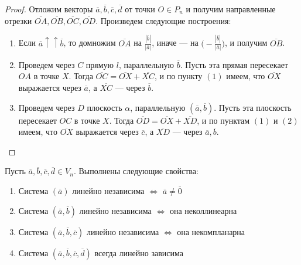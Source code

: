 \begin{proof}
	Отложим векторы $\overline{a}, \overline{b}, \overline{c}, \overline{d}$ от точки $O \in P_n$ и получим направленные отрезки $\overline{OA}, \overline{OB}, \overline{OC}, \overline{OD}$. Произведем следующие построения:
	\begin{enumerate}
		\item Если $\overline{a} \uparrow\uparrow \overline{b}$, то домножим $\overline{OA}$ на $\frac{|\overline{b}|}{|\overline{a}|}$, иначе --- на $\big(\!-\!\frac{|\overline{b}|}{|\overline{a}|}\big)$, и получим $\overline{OB}$.
		\item Проведем через $C$ прямую $l$, параллельную $\overline{b}$. Пусть эта прямая пересекает $OA$ в точке $X$. Тогда $\overline{OC} = \overline{OX} + \overline{XC}$, и по пункту $(1)$ имеем, что $\overline{OX}$ выражается через $\overline{a}$, а $\overline{XC}$ --- через $\overline{b}$.
		\item Проведем через $D$ плоскость $\alpha$, параллельную $(\overline{a}, \overline{b})$. Пусть эта плоскость пересекает $OC$ в точке $X$. Тогда $\overline{OD} = \overline{OX} + \overline{XD}$, и по пунктам $(1)$ и $(2)$ имеем, что $\overline{OX}$ выражается через $\overline{c}$, а $\overline{XD}$ --- через $\overline{a}, \overline{b}$.\qedhere
	\end{enumerate}
\end{proof}

\begin{theorem}
	Пусть $\overline{a}, \overline{b}, \overline{c}, \overline{d} \in V_n$. Выполнены следующие свойства:
	\begin{enumerate}
		\item Система $(\overline{a})$ линейно независима $\Leftrightarrow$ $\overline{a} \ne \overline{0}$
		\item Система $(\overline{a}, \overline{b})$ линейно независима $\Leftrightarrow$ она неколлинеарна
		\item Система $(\overline{a}, \overline{b}, \overline{c})$ линейно независима $\Leftrightarrow$ она некомпланарна
		\item Система $(\overline{a}, \overline{b}, \overline{c}, \overline{d})$ всегда линейно зависима
	\end{enumerate}
\end{theorem}


